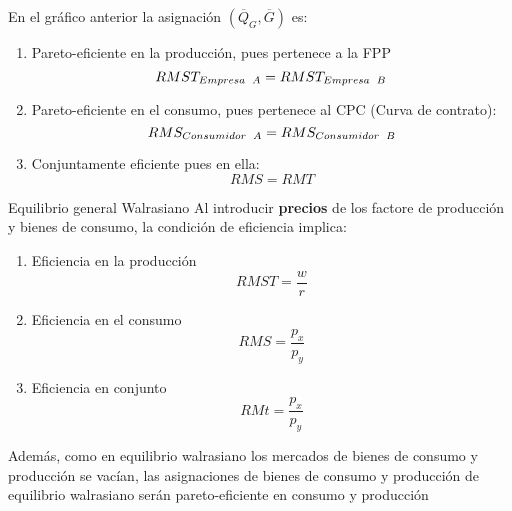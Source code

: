 \begin{frame}
	En el gráfico anterior la asignación $(\overline{Q}_G, \overline{G})$ es:
		\begin{enumerate}
			\item Pareto-eficiente en la producción, pues pertenece a la FPP
					$$RMST_{Empresa\enskip A} = RMST_{Empresa\enskip B}$$
			\item Pareto-eficiente en el consumo, pues pertenece al CPC (Curva de contrato):
					$$RMS_{Consumidor\enskip A} = RMS_{Consumidor\enskip B}$$
			\item Conjuntamente eficiente pues en ella:
					$$RMS = RMT$$
		\end{enumerate}
\end{frame}
\begin{frame}{Equilibrio general Walrasiano}
	Al introducir \textbf{precios} de los factore de producción y bienes de consumo, la condición de eficiencia implica:
		\begin{enumerate}
			\item Eficiencia en la producción
					$$RMST = \frac{w}{r}$$
			\item Eficiencia en el consumo
					$$RMS = \frac{p_x}{p_y}$$
			\item Eficiencia en conjunto
					$$RMt = \frac{p_x}{p_y}$$
		\end{enumerate}
	Además, como en equilibrio walrasiano los mercados de bienes de consumo y producción se vacían, las asignaciones  de bienes de consumo y producción de equilibrio walrasiano serán pareto-eficiente en consumo y producción
\end{frame}
